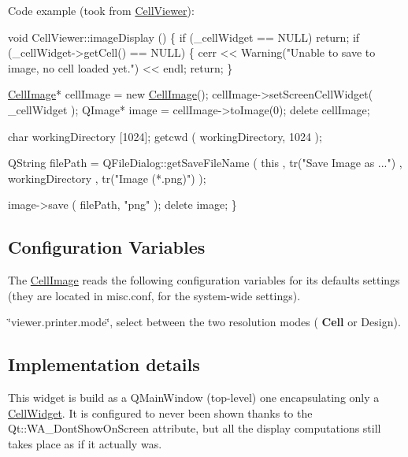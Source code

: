 Code example (took from \hyperlink{classHurricane_1_1CellViewer}{Cell\+Viewer})\+: 
\begin{DoxyCode}
\textcolor{keywordtype}{void}  CellViewer::imageDisplay ()
\{
  \textcolor{keywordflow}{if} (\_cellWidget == NULL) \textcolor{keywordflow}{return};
  \textcolor{keywordflow}{if} (\_cellWidget->getCell() == NULL) \{
    cerr << Warning(\textcolor{stringliteral}{"Unable to save to image, no cell loaded yet."}) << endl;
    \textcolor{keywordflow}{return};
  \}

  \hyperlink{classHurricane_1_1CellImage_a3f73f1a3a90d4625a5e0b31711affc34}{CellImage}* cellImage = \textcolor{keyword}{new} \hyperlink{classHurricane_1_1CellImage_a3f73f1a3a90d4625a5e0b31711affc34}{CellImage}();
  cellImage->setScreenCellWidget( \_cellWidget );
  QImage* image = cellImage->toImage(0);
  \textcolor{keyword}{delete} cellImage;

  \textcolor{keywordtype}{char} workingDirectory [1024];
  getcwd ( workingDirectory, 1024 );

  QString filePath = QFileDialog::getSaveFileName ( \textcolor{keyword}{this}
                                                  , tr(\textcolor{stringliteral}{"Save Image as ..."})
                                                  , workingDirectory
                                                  , tr(\textcolor{stringliteral}{"Image (*.png)"})
                                                  );

  image->save ( filePath, \textcolor{stringliteral}{"png"} );
  \textcolor{keyword}{delete} image;
\}
\end{DoxyCode}
\hypertarget{classHurricane_1_1CellImage_secImageConfiguration}{}\subsection{Configuration Variables}\label{classHurricane_1_1CellImage_secImageConfiguration}
The \hyperlink{classHurricane_1_1CellImage}{Cell\+Image} reads the following configuration variables for it\textquotesingle{}s defaults settings (they are located in {\ttfamily misc.\+conf}, for the system-\/wide settings). 
\begin{DoxyItemize}
\item {\ttfamily \char`\"{}viewer.\+printer.\+mode\char`\"{}}, select between the two resolution modes (\textbf{ Cell} or Design). 
\end{DoxyItemize}\hypertarget{classHurricane_1_1CellImage_secImageImplDetails}{}\subsection{Implementation details}\label{classHurricane_1_1CellImage_secImageImplDetails}
This widget is build as a Q\+Main\+Window (top-\/level) one encapsulating only a \hyperlink{classHurricane_1_1CellWidget}{Cell\+Widget}. It is configured to never been shown thanks to the {\ttfamily Qt\+::\+W\+A\+\_\+\+Dont\+Show\+On\+Screen} attribute, but all the display computations still takes place as if it actually was.

